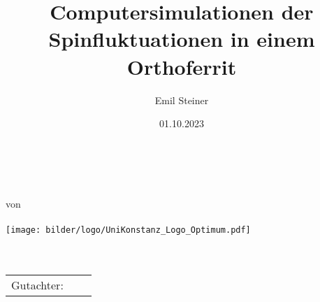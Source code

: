 

\usepackage{subfiles} %

\newcommand{\thesisTitle}{
\begin{sffamily}
\centering
\Huge\textbf{\docTitle}\\
\vspace{4em}
\huge\textbf{\docThesisType}\\
\centering von\\
\Large\textbf{\docAuthor}\\
\texttt{[image: bilder/logo/UniKonstanz\_Logo\_Optimum.pdf]}\\
\Large\docUnisection\\
\Large\docDepartment\\
\vspace{3em}
\centering\begin{tabular}{lll}%
Gutachter: & & \docSupervisorOne\\
\end{tabular}\\
\end{sffamily}
}%


\date{01.10.2023}
\author{Emil Steiner}
\title{Computersimulationen der Spinfluktuationen in einem Orthoferrit}
\subtitle{}




\thesisTitle
\thispagestyle{empty}
\newpage

% 

\tableofcontents
\thispagestyle{empty}	%
\newpage
\setcounter{page}{1}	%


